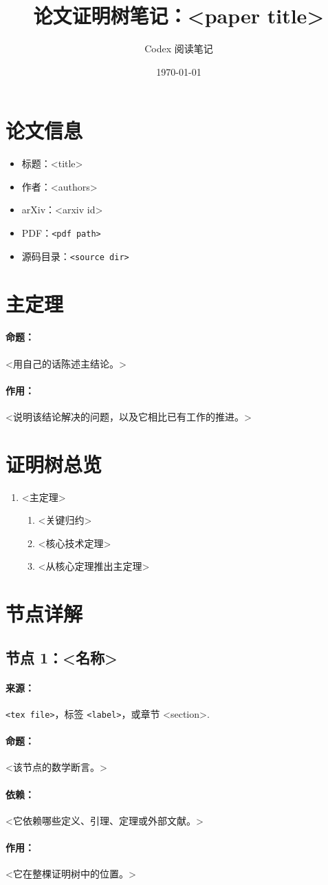 \documentclass[UTF8]{ctexart}
\title{论文证明树笔记：<paper title>}
\author{Codex 阅读笔记}
\date{\today}
\newcommand{\claim}[1]{\paragraph{命题：}#1}
\newcommand{\role}[1]{\paragraph{作用：}#1}
\newcommand{\deps}[1]{\paragraph{依赖：}#1}
\newcommand{\source}[1]{\paragraph{来源：}#1}
\begin{document}
\maketitle

\section{论文信息}
\begin{itemize}[leftmargin=2em]
  \item 标题：<title>
  \item 作者：<authors>
  \item arXiv：<arxiv id>
  \item PDF：\texttt{<pdf path>}
  \item 源码目录：\texttt{<source dir>}
\end{itemize}

\section{主定理}
\claim{<用自己的话陈述主结论。>}
\role{<说明该结论解决的问题，以及它相比已有工作的推进。>}

\section{证明树总览}
\begin{enumerate}[label=\textbf{T\arabic*.}, leftmargin=2.5em]
  \item <主定理>
  \begin{enumerate}[label*=\textbf{.\arabic*}, leftmargin=2.5em]
    \item <关键归约>
    \item <核心技术定理>
    \item <从核心定理推出主定理>
  \end{enumerate}
\end{enumerate}

\section{节点详解}

\subsection{节点 1：<名称>}
\source{\texttt{<tex file>}，标签 \texttt{<label>}，或章节 <section>.}
\claim{<该节点的数学断言。>}
\deps{<它依赖哪些定义、引理、定理或外部文献。>}
\role{<它在整棵证明树中的位置。>}
\end{document}
